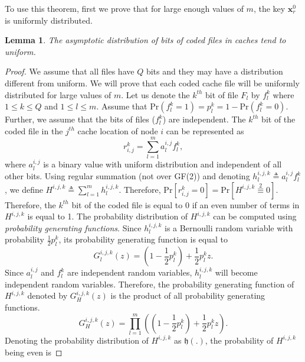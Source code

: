 \documentclass[10pt,journal]{IEEEtran}
\newtheorem{lem}{Lemma}
\begin{document}
{To use this theorem, first we prove that for large enough values of $m$, the key $\mathbf{x}_r^0$ is uniformly distributed.
\begin{lem}{\em
The asymptotic distribution of bits of coded files in caches tend to uniform.
 }\label{lem_uniform_key}
\end{lem}
\begin{proof}
We assume that all files have $Q$ bits and they may have a distribution different from uniform. We will prove that each coded cache file will be uniformly distributed for large values of $m$. Let us denote the $k^{th}$ bit of file $F_l$ by $f_l^k$
 where $1 \le k \le Q$ and $1 \le l \le m$. Assume that 
$\mathrm{Pr}(f_l^k = 1) = p_l^k = 1 - \mathrm{Pr}(f_l^k = 0)$. 
Further, we assume that the bits of files ($f_l^k$) are independent. The $k^{th}$ bit of the coded file in the $j^{th}$ cache location of node $i$ can be represented as
\begin{equation}
  r^{k}_{i,j} = \sum_{l=1}^m a_l^{i,j} f_l^k,
  \label{coded_file2}
 \end{equation}
 where $a_l^{i,j}$ is a binary value with  uniform distribution and independent of all other bits. Using regular summation (not over GF(2)) and denoting 
 $h^{i,j,k}_l \triangleq a_l^{i,j} f_l^k$, we define $ H^{i,j,k} \triangleq \sum_{l=1}^m h^{i,j,k}_l$. Therefore, $
  \mathrm{Pr}[r^k_{i,j} = 0] = \mathrm{Pr} [H^{i,j,k} \stackrel{2}{\equiv} 0]$.
Therefore, the $k^{th}$ bit of the coded file is equal to 0 if an even number of terms in $H^{i,j,k}$ is equal to 1. The probability distribution of $H^{i,j,k}$ can be computed using 
 {\em probability generating functions}. Since $h^{i,j,k}_l$ is a
 Bernoulli random variable with probability $\frac{1}{2} p_l^k$, its probability generating function is equal to  
 \begin{equation}
  G_{l}^{i,j,k} (z) = (1-\frac{1}{2} p_l^k)  + \frac{1}{2} p_l^k z.
  \label{pgf_bernoulli}
 \end{equation}
 Since $a_l^{i,j}$ and $f_l^k$ are independent random variables, $h^{i,j,k}_l$ will become independent random variables. Therefore, the probability generating function of $H^{i,j,k}$ denoted by $G_H^{i,j,k}(z)$ is the product of all probability generating functions.
  \begin{equation}
  G_H^{i,j,k} (z) = \prod_{l=1}^m \left( (1-\frac{1}{2} p_l^k)  + 
  \frac{1}{2} p_l^k z \right).
  \label{pgf_rijkl} 
 \end{equation}
Denoting the probability distribution of $H^{i,j,k}$ as $\mathfrak{h}(.)$, the probability of $H^{i,j,k}$ being even is

\end{proof}}
\end{document}
